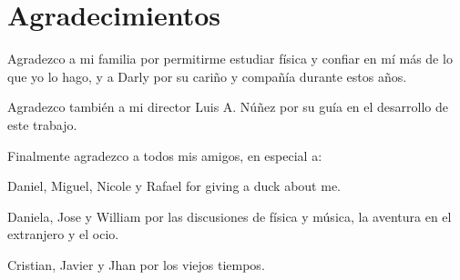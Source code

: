 

\chapter*{\hspace*{6.5cm}Agradecimientos}

\noindent Agradezco a mi familia por permitirme estudiar física y confiar en mí más de lo que yo lo hago, y a Darly por su cariño y compañía durante estos años.

\noindent Agradezco también a mi director Luis A. Núñez por su guía en el desarrollo de este trabajo.
  
\noindent Finalmente agradezco a todos mis amigos, en especial a:

\noindent Daniel, Miguel, Nicole y Rafael for giving a duck about me.

\noindent Daniela, Jose y William por las discusiones de física y música, la aventura en el extranjero y el ocio.

\noindent Cristian, Javier y Jhan por los viejos tiempos.

\newpage